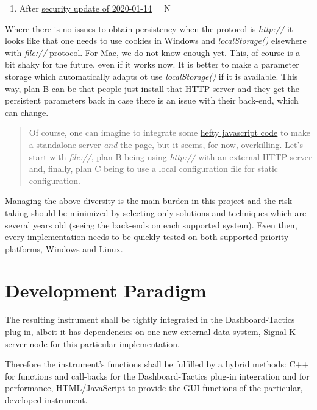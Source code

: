\documentclass[11pt]{article}
\providecommand{\tightlist}{%
      \setlength{\itemsep}{0pt}\setlength{\parskip}{0pt}}
\begin{document}
\begin{enumerate}
\def\labelenumi{(\arabic{enumi})}
\tightlist
\item
  After
  \href{https://support.microsoft.com/en-us/help/4534251/cumulative-security-update-for-internet-explorer}{security
  update of 2020-01-14} = N
\end{enumerate}

Where there is no issues to obtain persistency when the protocol is
\emph{http://} it looks like that one needs to use cookies in Windows
and \emph{localStorage()} elsewhere with \emph{file://} protocol. For
Mac, we do not know enough yet. This, of course is a bit shaky for the
future, even if it works now. It is better to make a parameter storage
which automatically adapts ot use \emph{localStorage()} if it is
available. This way, plan B can be that people just install that HTTP
server and they get the persistent parameters back in case there is an
issue with their back-end, which can change.

\begin{quote}
Of course, one can imagine to integrate some
\href{https://dev.to/rumkin/how-to-create-js-webserver-without-node-js-1hic}{hefty
javascript code} to make a standalone server \emph{and} the page, but it
seems, for now, overkilling. Let's start with \emph{file://}, plan B
being using \emph{http://} with an external HTTP server and, finally,
plan C being to use a local configuration file for static configuration.
\end{quote}

    Managing the above diversity is the main burden in this project and the
risk taking should be minimized by selecting only solutions and
techniques which are several years old (seeing the back-ends on each
supported system). Even then, every implementation needs to be quickly
tested on both supported priority platforms, Windows and Linux.

    \hypertarget{development-paradigm}{%
\section{Development Paradigm}\label{development-paradigm}}

    The resulting instrument shall be tightly integrated in the
Dashboard-Tactics plug-in, albeit it has dependencies on one new
external data system, Signal K server node for this particular
implementation.

    Therefore the instrument's functions shall be fulfilled by a hybrid
methods: C++ for functions and call-backs for the Dashboard-Tactics
plug-in integration and for performance, HTML/JavaScript to provide the
GUI functions of the particular, developed instrument.
\end{document}
